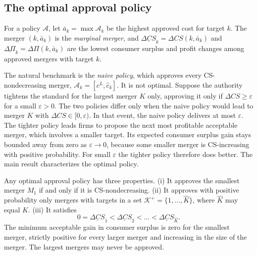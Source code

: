 \subsection{The optimal approval policy}\label{sec:11-nw-optimal}

For a policy $\mathcal{A}$, let $\bar a_k = \max\mathcal{A}_k$ be the highest approved cost for target $k$. The merger
$(k, \bar a_k)$ is the \emph{marginal merger}, and $\underline{\Delta\mathit{CS}}_k = \Delta\mathit{CS}(k, \bar a_k)$ and
$\underline{\Delta\Pi}_k = \Delta\Pi(k, \bar a_k)$ are the lowest consumer surplus and profit changes among approved
mergers with target $k$.

The natural benchmark is the \emph{naive policy}, which approves every CS-nondecreasing merger, $\mathcal{A}_k = [c^L,
\hat c_k]$. It is not optimal. Suppose the authority tightens the standard for the largest merger $K$ only, approving it
only if $\Delta\mathit{CS} \ge \varepsilon$ for a small $\varepsilon > 0$. The two policies differ only when the naive
policy would lead to merger $K$ with $\Delta\mathit{CS} \in [0, \varepsilon)$. In that event, the naive policy delivers
at most $\varepsilon$. The tighter policy leads firms to propose the next most profitable acceptable merger, which
involves a smaller target. Its expected consumer surplus gain stays bounded away from zero as $\varepsilon \to 0$,
because some smaller merger is CS-increasing with positive probability. For small $\varepsilon$ the tighter policy
therefore does better. The main result characterizes the optimal policy.

\begin{proposition}\label{prop:11-nw}
Any optimal approval policy has three properties. (i) It approves the smallest merger $M_1$ if and only if it is
CS-nondecreasing. (ii) It approves
with positive probability only mergers with targets in a set $\mathcal{K}^+ = \{1, \dots, \hat K\}$, where $\hat K$ may
equal $K$. (iii) It satisfies
\begin{equation}\label{eq:11-nw-prop1}
0 = \underline{\Delta\mathit{CS}}_1 < \underline{\Delta\mathit{CS}}_2 < \dots < \underline{\Delta\mathit{CS}}_{\hat K}.
\end{equation}
The minimum acceptable gain in consumer surplus is zero for the smallest merger, strictly positive for every larger
merger and increasing in the size of the merger. The largest mergers may never be approved.
\end{proposition}

